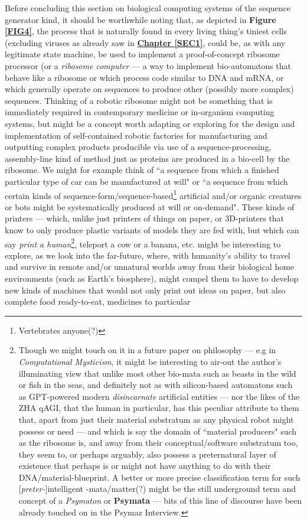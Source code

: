 \documentclass[a4paper, 18pt]{book} %
\begin{document}
Before concluding this section on biological computing systems of the sequence generator kind\cite{lutalo2025transformatic}, it should be worthwhile noting that, as depicted in \textbf{Figure \ref{FIG4}}, the process that is naturally found in every living thing's tiniest cells (excluding viruses as already saw in \textbf{\hyperref[SEC1]{Chapter \ref{SEC1}}}, could be, as with any legitimate state machine, be used to implement a proof-of-concept ribosome processor (or a \textit{ribosome computer} --- a way to implement bio-automatons that behave like a ribosome or which process code similar to DNA and mRNA, or which generally operate on sequences to produce other (possibly more complex) sequences. Thinking of a robotic ribosome might not be something that is immediately required in contemporary medicine or in-organism computing systems, but might be a concept worth adapting or exploring for the design and implementation of self-contained robotic factories for manufacturing and outputting complex products producible via use of a sequence-processing, assembly-line kind of method just as proteins are produced in a bio-cell by the ribosome. We might for example think of ``a sequence from which a finished particular type of car can be manufactured at will" or ``a sequence from which certain kinds of sequence-form/sequence-based\footnote{Vertebrates anyone(?)} artificial and/or organic creatures or bots might be systematically produced at will or on-demand". These kinds of printers --- which, unlike just printers of things on paper, or 3D-printers that know to only produce plastic variants of models they are fed with, but which can say \textit{print a human}\footnote{Though we might touch on it in a future paper on philosophy --- e.g in \textit{Computational Mysticism}\cite{lutalo2024mysticism}, it might be interesting to air-out the author's illuminating view that unlike most other bio-mata such as beasts in the wild or fish in the seas, and definitely not as with silicon-based automatons such as GPT-powered modern \textit{disincarnate} artificial entities --- nor the likes of the ZHA qAGI\cite{jwlzha}, that the human in particular, has this peculiar attribute to them that, apart from just their material substratum as any physical robot might possess or need --- and which is say the domain of ``material producers" such as the ribosome is, and away from their conceptual/software substratum too, they seem to, or perhaps arguably, also possess a preternatural layer of existence that perhaps is or might not have anything to do with their DNA/material-blueprint. A better or more precise classification term for such [\textit{preter-}]intelligent -mata/matter(?) might be the still underground term and concept of a \textit{Psymaton} or \textbf{Psymata} --- bits of this line of discourse have been already touched on in the Psymaz Interview\cite{lutalo2025unraveling}.}, teleport a cow or a banana, etc. might be interesting to explore, as we look into the far-future, where, with humanity's ability to travel and survive in remote and/or unnatural worlds away from their biological home environments (such as Earth's biosphere), might compel them to have to develop new kinds of machines that would not only print out ideas on paper, but also complete food ready-to-eat, medicines to particular 
\end{document}

